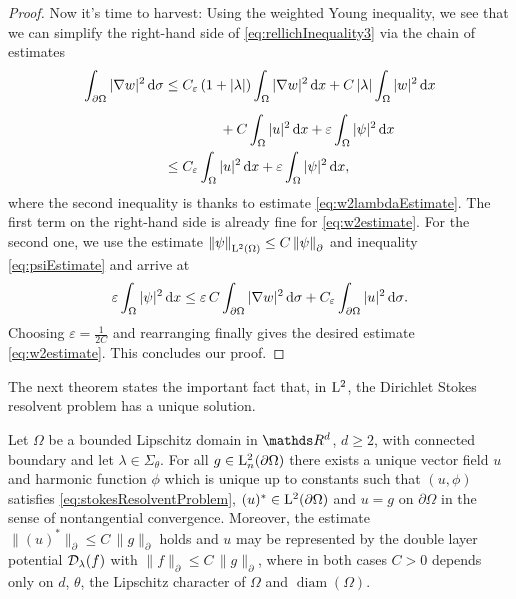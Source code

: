 \begin{proof}
  Now it's time to harvest: 
  Using the weighted Young inequality, we see that we can simplify the right-hand side of \eqref{eq:rellichInequality3} via the chain of estimates
  \begin{align*}
    \int_{\partial\Omega} |\nabla w|^2 \, {\operatorname{d}\!{\sigma}} 
    &\leq C_\varepsilon\,  (1 + |\lambda|) \int_{\Omega} |\nabla w|^2 \, {\operatorname{d}\!{x}} + C\,  |\lambda| \int_\Omega |w|^2 \, {\operatorname{d}\!{x}} \\[0.5em]
    &\qquad\qquad+ C \int_\Omega |u|^2 \, {\operatorname{d}\!{x}} + \varepsilon \int_\Omega |\psi|^2 \, {\operatorname{d}\!{x}}  \\
    &\leq C_\varepsilon \int_\Omega |u|^2 \, {\operatorname{d}\!{x}} + \varepsilon \int_\Omega |\psi|^2 \, {\operatorname{d}\!{x}},
  \end{align*}
  where the second inequality is thanks to estimate \eqref{eq:w2lambdaEstimate}.
  The first term on the right-hand side is already fine for \eqref{eq:w2estimate}.
  For the second one, we use the estimate $\|\psi\|^{}_{\mathrm{L}^2(\Omega)} \leq C\, \|\psi\|^{}_\partial$ and inequality \eqref{eq:psiEstimate} and arrive at
  \begin{align*}
    \varepsilon \int_\Omega |\psi|^2 \, {\operatorname{d}\!{x}} \leq \varepsilon \, C \int_{\partial\Omega} |\nabla w|^2 \, {\operatorname{d}\!{\sigma}} + C_\varepsilon \int_{\partial\Omega} |u|^2 \, {\operatorname{d}\!{\sigma}}.
  \end{align*}
  Choosing $\varepsilon = \frac{1}{2 C}$ and rearranging finally gives the desired estimate \eqref{eq:w2estimate}.
  This concludes our proof.
\end{proof}

The next theorem states the important fact that, in $\mathrm{L}^2$, the Dirichlet Stokes resolvent problem has a unique solution.

\begin{thm}
  \label{thm:exAndUniqueSolution}
  Let $\Omega$ be a bounded Lipschitz domain in $\R^d$, $d \geq 2$, with connected boundary and let $\lambda \in \Sigma_\theta$.
  For all $g \in \mathrm{L}^2_n(\partial\Omega)$ there exists a unique vector field $u$ and harmonic function $\phi$ which is unique up to constants such that $(u,\phi)$ satisfies \eqref{eq:stokesResolventProblem}, $(u)^* \in \mathrm{L}^2(\partial\Omega)$ and $u = g$ on $\partial\Omega$ in the sense of nontangential convergence.
  Moreover, the estimate $ \| (u)^* \|^{}_\partial \leq C \, \| g\|^{}_\partial$ holds and $u$ may be represented by the double layer potential $\mathcal{D}_\lambda(f)$ with $\|f\|^{}_\partial \leq C \, \|g\|^{}_\partial$, where in both cases $C > 0$ depends only on $d$, $\theta$, the Lipschitz character of $\Omega$ and $\operatorname{diam}(\Omega)$.
\end{thm}

